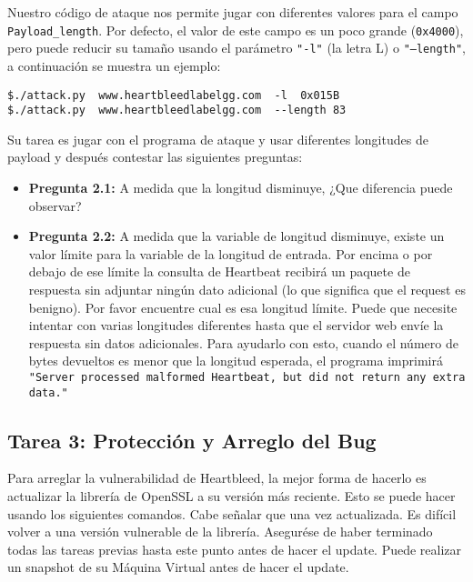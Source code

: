 Nuestro código de ataque nos permite jugar con diferentes valores para el campo \texttt{Payload\_length}. Por defecto, el valor de este campo es un poco grande (\texttt{0x4000}), pero puede reducir su tamaño usando el parámetro  \texttt{"-l"}  (la letra L) o \texttt{"--length"}, a continuación se muestra un ejemplo:

\begin{lstlisting}
$./attack.py  www.heartbleedlabelgg.com  -l  0x015B 
$./attack.py  www.heartbleedlabelgg.com	 --length 83
\end{lstlisting}
 
Su tarea es jugar con el programa de ataque y usar diferentes longitudes de payload y después contestar las siguientes preguntas:


\begin{itemize}
  \item {\bf Pregunta 2.1:} A medida que la longitud disminuye, ¿Que diferencia puede observar?
  
  \item {\bf Pregunta 2.2:} A medida que la variable de longitud disminuye, existe un valor límite para la variable de la longitud de entrada. Por encima o por debajo de ese límite la consulta de Heartbeat recibirá un paquete de respuesta sin adjuntar ningún dato adicional (lo que significa que el request es benigno). Por favor encuentre cual es esa longitud límite. Puede que necesite intentar con varias longitudes diferentes hasta que el servidor web envíe la respuesta sin datos adicionales. Para ayudarlo con esto, cuando el número de bytes devueltos es menor que la longitud esperada, el programa imprimirá \texttt{"Server processed malformed Heartbeat, but did not return any extra data."}
\end{itemize}




\subsection{Tarea 3: Protección y Arreglo del Bug}

Para arreglar la vulnerabilidad de Heartbleed, la mejor forma de hacerlo es actualizar la librería de OpenSSL a su versión más reciente. Esto se puede hacer usando los siguientes comandos.
Cabe señalar que una vez actualizada. Es difícil volver a una versión vulnerable de la librería. Asegurése de haber terminado todas las tareas previas hasta este punto antes de hacer el update. Puede realizar un snapshot de su Máquina Virtual antes de hacer el update.

